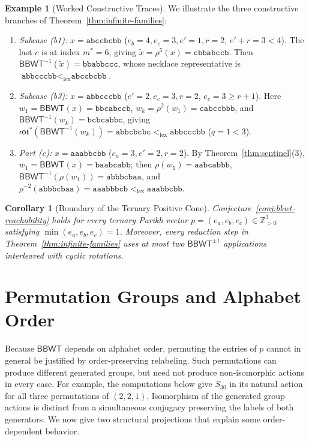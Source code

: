 \documentclass[11pt,a4paper]{article}
\newtheorem{corollary}{Corollary}
\theoremstyle{definition}
\newtheorem{example}{Example}
\newcommand{\BBWT}{\mathsf{BBWT}}
\newcommand{\rot}{\mathsf{rot}}
\newcommand{\lex}{\mathrm{lex}}
\begin{document}
\begin{example}[Worked Constructive Traces]
We illustrate the three constructive branches of Theorem~\ref{thm:infinite-families}:
\begin{enumerate}[leftmargin=*]
    \item \emph{Subcase (b1):} $x = \texttt{abccbcbb}$ ($e_b = 4, e_c = 3, e' = 1, r = 2$, $e'+r = 3 < 4$). The last $c$ is at index $m^* = 6$, giving $\tilde{x} = \rho^5(x) = \texttt{cbbabccb}$. Then $\BBWT^{-1}(\tilde{x}) = \texttt{bbabbccc}$, whose necklace representative is $\texttt{abbcccbb} <_{\lex} \texttt{abccbcbb}$.
    \item \emph{Subcase (b3):} $x = \texttt{abbcccbb}$ ($e' = 2, e_c = 3, r = 2$, $e_c = 3 \ge r+1$). Here $w_1 = \BBWT(x) = \texttt{bbcabccb}$, $w_k = \rho^2(w_1) = \texttt{cabccbbb}$, and $\BBWT^{-1}(w_k) = \texttt{bcbcabbc}$, giving $\rot^*(\BBWT^{-1}(w_k)) = \texttt{abbcbcbc} <_{\lex} \texttt{abbcccbb}$ ($q = 1 < 3$).
    \item \emph{Part (c):} $x = \texttt{aaabbcbb}$ ($e_a = 3, e' = 2, r = 2$). By Theorem~\ref{thm:sentinel}(3), $w_1 = \BBWT(x) = \texttt{baabcabb}$; then $\rho(w_1) = \texttt{aabcabbb}$, $\BBWT^{-1}(\rho(w_1)) = \texttt{abbbcbaa}$, and $\rho^{-2}(\texttt{abbbcbaa}) = \texttt{aaabbbcb} <_{\lex} \texttt{aaabbcbb}$.
\end{enumerate}
\end{example}

\begin{corollary}[Boundary of the Ternary Positive Cone]
\label{cor:ternary-boundary}
Conjecture~\ref{conj:bbwt-reachability} holds for every ternary Parikh vector $p = (e_a, e_b, e_c) \in \mathbb{Z}_{>0}^3$ satisfying $\min(e_a, e_b, e_c) = 1$. Moreover, every reduction step in Theorem~\ref{thm:infinite-families} uses at most two $\BBWT^{\pm 1}$ applications interleaved with cyclic rotations.
\end{corollary}

\section{Permutation Groups and Alphabet Order}
\label{sec:group-architecture}

Because $\BBWT$ depends on alphabet order, permuting the entries of $p$ cannot in general be justified by order-preserving relabeling. Such permutations can produce different generated groups, but need not produce non-isomorphic actions in every case. For example, the computations below give $S_{30}$ in its natural action for all three permutations of $(2,2,1)$. Isomorphism of the generated group actions is distinct from a simultaneous conjugacy preserving the labels of both generators. We now give two structural projections that explain some order-dependent behavior.
\end{document}
